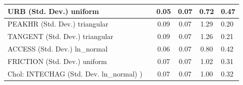 \begin{table}
\begin{center}
\begin{tabular}{|l|l|c|c|c|l|}
			\hline
			URB (Std. Dev.) uniform &  & 0.05 & 0.07 & 0.72 & 0.47 \\
			\hline
			PEAKHR (Std. Dev.) triangular &  & 0.09 & 0.07 & 1.29 & 0.20 \\
			\hline
			TANGENT (Std. Dev.) triangular &  & 0.09 & 0.07 & 1.26 & 0.21 \\
			\hline
			ACCESS (Std. Dev.) ln_normal &  & 0.06 & 0.07 & 0.80 & 0.42 \\
			\hline
			FRICTION (Std. Dev.) uniform &  & 0.07 & 0.07 & 1.02 & 0.31 \\
			\hline
			 Chol: INTECHAG (Std. Dev. ln_normal) ) &  & 0.07 & 0.07 & 1.00 & 0.32 \\
			\hline
		\end{tabular}
	\end{center}
\end{table}
